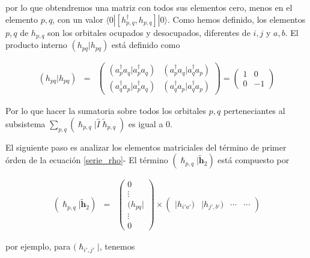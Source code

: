 \documentclass[
	12pt, %
]{fphw}
\begin{document}
por lo que obtendremos una matriz con todos sus elementos cero, menos en el elemento $p,q$, 
con un valor $\langle0| [h^\dagger_{p,q}, h_{p,q}] |0\rangle$. 
Como hemos definido, los elementos $p,q$ de $h_{p,q}$ son los orbitales ocupados y desocupados, 
diferentes de $i,j$ y $a,b$.
El producto interno $(h_{pq} | h_{pq})$ está definido como 

\begin{eqnarray}
	(h_{pq} | h_{pq}) &=& \begin{pmatrix}
		(a^\dagger_p a_q| a^\dagger_p a_q) &  (a^\dagger_p a_q| a^\dagger_q a_p) \\
		(a^\dagger_q a_p| a^\dagger_p a_q)  & (a^\dagger_q a_p| a^\dagger_q a_p)
	\end{pmatrix} 
	= \begin{pmatrix}
		1 &  0 \\
		0 &  -1
		\end{pmatrix}
\end{eqnarray}



Por lo que hacer la sumatoria sobre todos los orbitales $p,q$ perteneciantes al subsistema  
$\sum_{p,q} (\bm{\hslash}_{p,q} |\hat{I} \bm{\widetilde{\hslash}}_{p,q})$ es igual a 0.


El siguiente paso es analizar los elementos matriciales del término de primer órden de la ecuación \ref{serie_rho}-
El término $( \bm{\hslash}_{p,q} | \bm{\widetilde{h}}_2 )$ está compuesto por

\begin{eqnarray}
	( \bm{\hslash}_{p,q} | \bm{\widetilde{h}}_2 ) &=& \begin{pmatrix}
		
		0 \\
		\vdots \\
		(h_{pq}| \\
		\vdots \\
		0
	\end{pmatrix}
	\times \begin{pmatrix}
		
		 |h_{i'a'}) & |h_{j',b'}) & \cdots  & \cdots
	\end{pmatrix} \end{eqnarray}

por ejemplo, para $( \bm{\hslash}_{i',j'} | $, tenemos 
\end{document}
